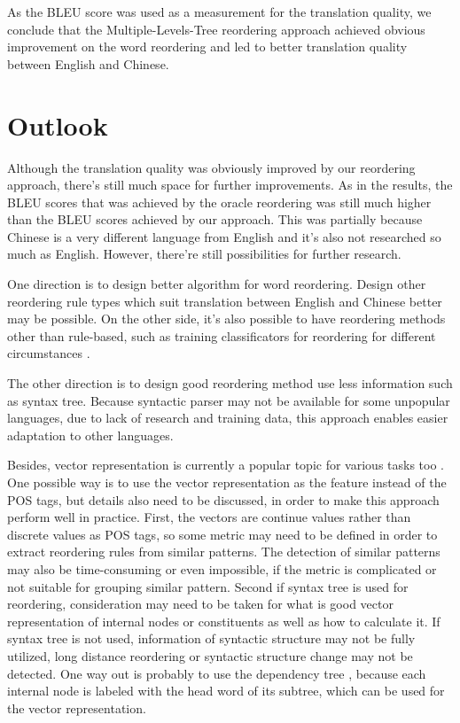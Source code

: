 As the \ac{BLEU} score was used as a measurement for the translation quality, we conclude that the Multiple-Levels-Tree reordering approach achieved obvious improvement on the word reordering and led to better translation quality between English and Chinese.

\section{Outlook}
\label{ch:Discussion:sec:Outlook}

Although the translation quality was obviously improved by our reordering approach, there's still much space for further improvements. As in the results, the \ac{BLEU} scores that was achieved by the oracle reordering was still much higher than the \ac{BLEU} scores achieved by our approach. This was partially because Chinese is a very different language from English and it's also not researched so much as English. However, there're still possibilities for further research.

One direction is to design better algorithm for word reordering. Design other reordering rule types which suit translation between English and Chinese better may be possible. On the other side, it's also possible to have reordering methods other than rule-based, such as training classificators for reordering for different circumstances \citep{google}.

The other direction is to design good reordering method use less information such as syntax tree. Because syntactic parser may not be available for some unpopular languages, due to lack of research and training data, this approach enables easier adaptation to other languages.

Besides, vector representation is currently a popular topic for various tasks too \citep{oxford, Mikolov}. One possible way is to use the vector representation as the feature instead of the \ac{POS} tags, but details also need to be discussed, in order to make this approach perform well in practice. First, the vectors are continue values rather than discrete values as \ac{POS} tags, so some metric may need to be defined in order to extract reordering rules from similar patterns. The detection of similar patterns may also be time-consuming or even impossible, if the metric is complicated or not suitable for grouping similar pattern. Second if syntax tree is used for reordering, consideration may need to be taken for what is good vector representation of internal nodes or constituents as well as how to calculate it. If syntax tree is not used, information of syntactic structure may not be fully utilized, long distance reordering or syntactic structure change may not be detected. One way out is probably to use the dependency tree \citep{depend}, because each internal node is labeled with the head word of its subtree, which can be used for the vector representation. 

